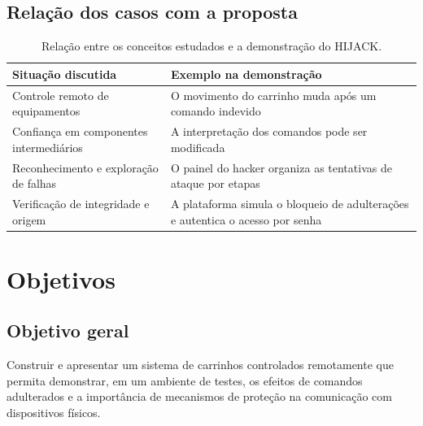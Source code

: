 \documentclass[12pt,a4paper]{article}
\begin{document}
\subsection{Relação dos casos com a proposta}
\begin{table}[H]
\centering\small\renewcommand{\arraystretch}{1.3}
\begin{tabularx}{\textwidth}{>{\raggedright\arraybackslash}X >{\raggedright\arraybackslash}X}
\toprule
\textbf{Situação discutida} & \textbf{Exemplo na demonstração} \\
\midrule
Controle remoto de equipamentos & O movimento do carrinho muda após um comando indevido \\
Confiança em componentes intermediários & A interpretação dos comandos pode ser modificada \\
Reconhecimento e exploração de falhas & O painel do hacker organiza as tentativas de ataque por etapas \\
Verificação de integridade e origem & A plataforma simula o bloqueio de adulterações e autentica o acesso por senha \\
\bottomrule
\end{tabularx}
\caption{Relação entre os conceitos estudados e a demonstração do HIJACK.}
\label{tab:relacao}
\end{table}

\section{Objetivos}
\subsection{Objetivo geral}
Construir e apresentar um sistema de carrinhos controlados remotamente que
permita demonstrar, em um ambiente de testes, os efeitos de comandos
adulterados e a importância de mecanismos de proteção na comunicação com
dispositivos físicos.
\end{document}
